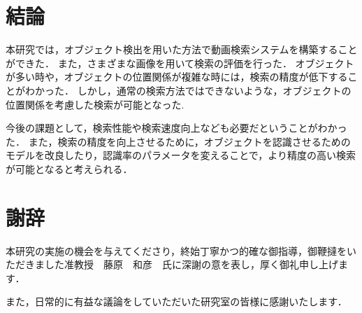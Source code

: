 \documentclass[a4j,12pt,dvipdfmx]{jreport}
\begin{document}
\chapter{結論}
\label{sec:conclusion}
本研究では，オブジェクト検出を用いた方法で動画検索システムを構築することができた．
また，さまざまな画像を用いて検索の評価を行った．
オブジェクトが多い時や，オブジェクトの位置関係が複雑な時には，検索の精度が低下することがわかった．
しかし，通常の検索方法ではできないような，オブジェクトの位置関係を考慮した検索が可能となった.

今後の課題として，検索性能や検索速度向上なども必要だということがわかった．
また，検索の精度を向上させるために，オブジェクトを認識させるためのモデルを改良したり，認識率のパラメータを変えることで，より精度の高い検索が可能となると考えられる．


\chapter*{謝辞}
本研究の実施の機会を与えてくださり，終始丁寧かつ的確な御指導，御鞭撻をいただきました准教授　藤原　和彦　氏に深謝の意を表し，厚く御礼申し上げます．\par
また，日常的に有益な議論をしていただいた研究室の皆様に感謝いたします．

\clearpage




\end{document}
